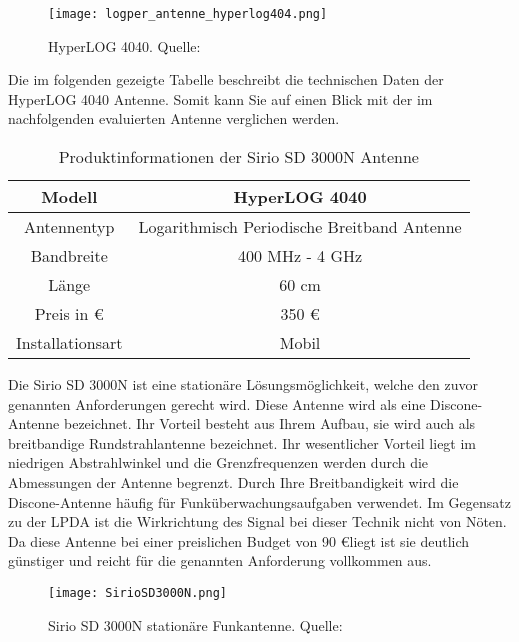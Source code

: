 \begin{figure}[H]
	\centering
	\texttt{[image: logper\_antenne\_hyperlog404.png]}
	\caption[HyperLOG 4040]{HyperLOG 4040. Quelle: \cite{Funktechnik:2018}} 
	\label{HyperLOG 4040}
\end{figure}  

Die im folgenden gezeigte Tabelle beschreibt die technischen Daten der HyperLOG 4040 Antenne. Somit kann Sie auf einen Blick mit der im nachfolgenden evaluierten Antenne verglichen werden.

\begin{table}[H]
	\centering
	\begin{tabular}{c|c}
		Modell & HyperLOG 4040\\
		\hline
		Antennentyp & Logarithmisch Periodische Breitband Antenne\\ 
		\hline 
		Bandbreite & 400 MHz - 4 GHz\\ 
		\hline 
		Länge &  60 cm\\ 
		\hline 
		Preis in \euro &  350 \euro \\ 
		\hline 
		Installationsart & Mobil\\ 
		
	\end{tabular} 
	\caption{Produktinformationen der Sirio SD 3000N Antenne}
\end{table}

Die Sirio SD 3000N ist eine stationäre Lösungsmöglichkeit, welche den zuvor genannten Anforderungen gerecht wird. Diese Antenne wird als eine Discone-Antenne bezeichnet. Ihr Vorteil besteht aus Ihrem Aufbau, sie wird auch als breitbandige Rundstrahlantenne bezeichnet. Ihr wesentlicher Vorteil liegt im niedrigen Abstrahlwinkel und die Grenzfrequenzen werden durch die Abmessungen der Antenne begrenzt. Durch Ihre Breitbandigkeit wird die Discone-Antenne häufig für Funküberwachungsaufgaben verwendet. Im Gegensatz zu der LPDA ist die Wirkrichtung des Signal bei dieser Technik nicht von Nöten. Da diese Antenne bei einer preislichen Budget von 90 \euro liegt ist sie deutlich günstiger und reicht für die genannten Anforderung vollkommen aus.


\begin{figure}[H]
	\centering
	\texttt{[image: SirioSD3000N.png]}
	\caption[Sirio SD 3000N stationäre Funkantenne]{Sirio SD 3000N stationäre Funkantenne. Quelle: \cite{Funktechnik:2018}} 
	\label{Sirio SD 3000N Antenne}
\end{figure}


